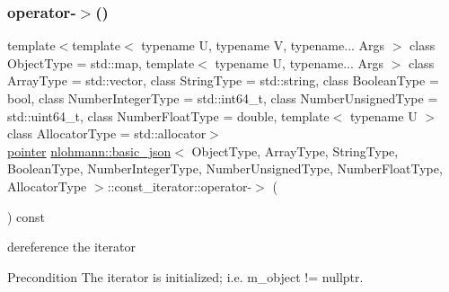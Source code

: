 \subsubsection{\texorpdfstring{operator-\/$>$()}{operator->()}}
{\footnotesize\ttfamily template$<$template$<$ typename U, typename V, typename... Args $>$ class Object\+Type = std\+::map, template$<$ typename U, typename... Args $>$ class Array\+Type = std\+::vector, class String\+Type  = std\+::string, class Boolean\+Type  = bool, class Number\+Integer\+Type  = std\+::int64\+\_\+t, class Number\+Unsigned\+Type  = std\+::uint64\+\_\+t, class Number\+Float\+Type  = double, template$<$ typename U $>$ class Allocator\+Type = std\+::allocator$>$ \\
\hyperlink{classnlohmann_1_1basic__json_1_1const__iterator_a1da96fc3054d547e7706d3a2f073f389}{pointer} \hyperlink{classnlohmann_1_1basic__json}{nlohmann\+::basic\+\_\+json}$<$ Object\+Type, Array\+Type, String\+Type, Boolean\+Type, Number\+Integer\+Type, Number\+Unsigned\+Type, Number\+Float\+Type, Allocator\+Type $>$\+::const\+\_\+iterator\+::operator-\/$>$ (\begin{DoxyParamCaption}{ }\end{DoxyParamCaption}) const\hspace{0.3cm}{\ttfamily [inline]}}



dereference the iterator 

\begin{DoxyPrecond}{Precondition}
The iterator is initialized; i.\+e. {\ttfamily m\+\_\+object != nullptr}. 
\end{DoxyPrecond}
\mbox{\label{classnlohmann_1_1basic__json_1_1const__iterator_ae0f996eef6a970b2e654c4f6d33d6f9a}} 
